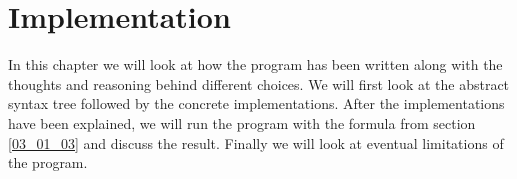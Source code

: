 \chapter{Implementation}
\label{04}

In this chapter we will look at how the program has been written along with the thoughts and reasoning behind different choices. We will first look at the abstract syntax tree followed by the concrete implementations. After the implementations have been explained, we will run the program with the formula from section \ref{03_01_03} and discuss the result. Finally we will look at eventual limitations of the program.




